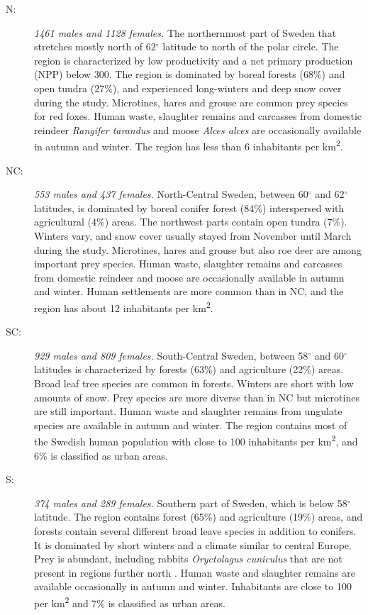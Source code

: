 \documentclass[12pt,a4paper,final,abstract=true,headings=small]{scrartcl}
\begin{document}
\begin{description}
  \item [N:] \emph{1461 males and 1128 females.} The northernmost part of Sweden that stretches mostly north of 62$^{\circ}$ latitude to north of the polar circle. The region is characterized by low productivity and a net primary production (NPP) below 300. The region is dominated by boreal forests (68\%) and open tundra (27\%), and experienced long-winters and deep snow cover during the study. Microtines, hares and grouse are common prey species for red foxes. Human waste, slaughter remains and carcasses from domestic reindeer \emph{Rangifer tarandus} and moose \emph{Alces alces} are occasionally available in autumn and winter. The region has less than 6 inhabitants per km\textsuperscript{2}.

  \item [NC:] \emph{553 males and 437 females.} North-Central Sweden, between 60$^{\circ}$ and 62$^{\circ}$latitudes, is dominated by boreal conifer forest (84\%) interspersed with agricultural (4\%) areas. The northwest parts contain open tundra (7\%). Winters vary, and snow cover usually stayed from November until March during the study. Microtines, hares and grouse but also roe deer are among important prey species. Human waste, slaughter remains and carcasses from domestic reindeer and moose are occasionally available in autumn and winter. Human settlements are more common than in NC, and the region has about 12 inhabitants per km\textsuperscript{2}.

  \item [SC:] \emph{929 males and 809 females.} South-Central Sweden, between 58$^{\circ}$ and 60$^{\circ}$latitudes is characterized by forests (63\%) and agriculture (22\%) areas. Broad leaf tree species are common in forests. Winters are short with low amounts of snow. Prey species are more diverse than in NC but microtines are still important. Human waste and slaughter remains from ungulate species are available in autumn and winter. The region contains most of the Swedish human population with close to 100 inhabitants per km\textsuperscript{2}, and 6\% is classified as urban areas.

  \item [S:] \emph{374 males and 289 females.} Southern part of Sweden, which is below 58$^{\circ}$ latitude. The region contains forest (65\%) and agriculture (19\%) areas, and forests contain  several different broad leave species in addition to conifers. It is dominated by short winters and a climate similar to central Europe. Prey is abundant, including rabbits \emph{Oryctolagus cuniculus} that are not present in regions further north \citep{erlingeCanVertebratePredators1984}. Human waste and slaughter remains are available occasionally in autumn and winter. Inhabitants are close to 100 per km\textsuperscript{2} and 7\% is classified as urban areas.

\end{description}
\end{document}
